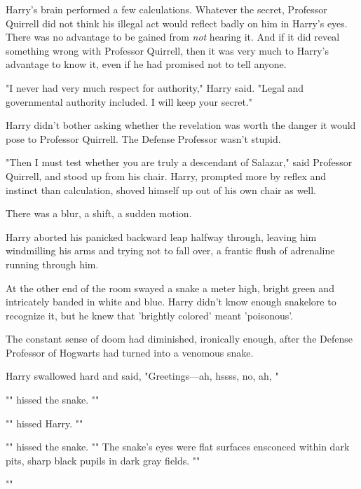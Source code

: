 Harry's brain performed a few calculations. Whatever the secret, Professor 
Quirrell did not think his illegal act would reflect badly on him in Harry's 
eyes. There was no advantage to be gained from \emph{not} hearing it. And if it 
did reveal something wrong with Professor Quirrell, then it was very much to 
Harry's advantage to know it, even if he had promised not to tell anyone.

"I never had very much respect for authority," Harry said. "Legal and 
governmental authority included. I will keep your secret."

Harry didn't bother asking whether the revelation was worth the danger it would 
pose to Professor Quirrell. The Defense Professor wasn't stupid.

"Then I must test whether you are truly a descendant of Salazar," said 
Professor Quirrell, and stood up from his chair. Harry, prompted more by reflex 
and instinct than calculation, shoved himself up out of his own chair as well.

There was a blur, a shift, a sudden motion.

Harry aborted his panicked backward leap halfway through, leaving him 
windmilling his arms and trying not to fall over, a frantic flush of adrenaline 
running through him.

At the other end of the room swayed a snake a meter high, bright green and 
intricately banded in white and blue. Harry didn't know enough snakelore to 
recognize it, but he knew that 'brightly colored' meant 'poisonous'.

The constant sense of doom had diminished, ironically enough, after the Defense 
Professor of Hogwarts had turned into a venomous snake.

Harry swallowed hard and said, "Greetings---ah, hssss, no, ah, 
"

"" hissed the snake. ""

"" hissed Harry. ""

"" hissed the snake. "" The snake's eyes were flat surfaces ensconced within dark pits, sharp 
black pupils in dark gray fields. ""

""

